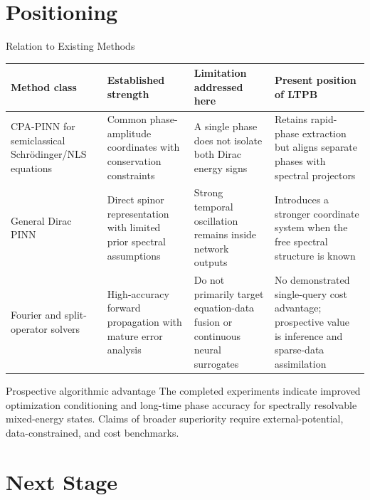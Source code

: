 \documentclass[aspectratio=169,10pt]{beamer}
\begin{document}
\section{Positioning}

\begin{frame}{Relation to Existing Methods}
\scriptsize
\renewcommand{\arraystretch}{1.16}
\begin{tabularx}{\textwidth}{@{}lYYY@{}}
\toprule
Method class & Established strength & Limitation addressed here & Present position of LTPB \\
\midrule
CPA-PINN for semiclassical Schr\"odinger/NLS equations &
Common phase-amplitude coordinates with conservation constraints &
A single phase does not isolate both Dirac energy signs &
Retains rapid-phase extraction but aligns separate phases with spectral projectors \\
General Dirac PINN &
Direct spinor representation with limited prior spectral assumptions &
Strong temporal oscillation remains inside network outputs &
Introduces a stronger coordinate system when the free spectral structure is known \\
Fourier and split-operator solvers &
High-accuracy forward propagation with mature error analysis &
Do not primarily target equation-data fusion or continuous neural surrogates &
No demonstrated single-query cost advantage; prospective value is inference and sparse-data assimilation \\
\bottomrule
\end{tabularx}

\vspace{0.7em}
\begin{block}{Prospective algorithmic advantage}
The completed experiments indicate improved optimization conditioning and
long-time phase accuracy for spectrally resolvable mixed-energy states. Claims
of broader superiority require external-potential, data-constrained, and cost
benchmarks.
\end{block}
\end{frame}

\section{Next Stage}
\end{document}
